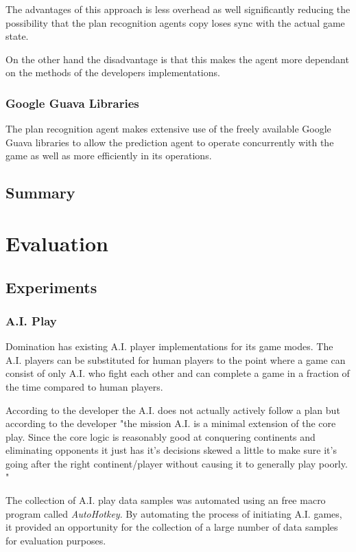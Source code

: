 \documentclass[parskip]{cs4rep}
\begin{document}
The advantages of this approach is less overhead as well significantly reducing the possibility that the plan recognition agents copy loses sync with the actual game state. 

On the other hand the disadvantage is that this makes the agent more dependant on the methods of the developers implementations.

\subsection{Google Guava Libraries}

The plan recognition agent makes extensive use of the freely available Google Guava libraries to allow the prediction agent to operate concurrently with the game as well as more efficiently in its operations.

\section{Summary}

\chapter{Evaluation} 

\section{Experiments}

\subsection{A.I. Play}

Domination has existing A.I. player implementations for its game modes. The A.I. players can be substituted for human players to the point where a game can consist of only A.I. who fight each other and can complete a game in a fraction of the time compared to human players. 

According to the developer the A.I. does not actually actively follow a plan but according to the developer "the mission A.I. is a minimal extension of the core play. Since the core logic is reasonably good at conquering continents and eliminating opponents it just has it's decisions skewed a little to make sure it's going after the right continent/player without causing it to generally play poorly. "

The collection of A.I. play data samples was automated using an free macro program called \textit{AutoHotkey}. By automating the process of initiating A.I. games, it provided an opportunity for the collection of a large number of data samples for evaluation purposes. 
\end{document}

